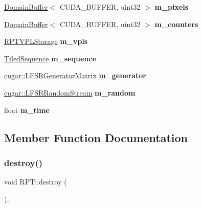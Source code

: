 \begin{DoxyCompactItemize}
\mbox{\label{struct_r_p_t_a7391b970846b087971be97cf5c9b7609}} 
\hyperlink{class_domain_buffer}{Domain\+Buffer}$<$ C\+U\+D\+A\+\_\+\+B\+U\+F\+F\+ER, uint32 $>$ {\bfseries m\+\_\+pixels}
\item 
\mbox{\label{struct_r_p_t_ae5e2d6769ba70cc660adf45915e0ebca}} 
\hyperlink{class_domain_buffer}{Domain\+Buffer}$<$ C\+U\+D\+A\+\_\+\+B\+U\+F\+F\+ER, uint32 $>$ {\bfseries m\+\_\+counters}
\item 
\mbox{\label{struct_r_p_t_a699e428743a17f8c336aab20711716ad}} 
\hyperlink{struct_r_p_t_v_p_l_storage}{R\+P\+T\+V\+P\+L\+Storage} {\bfseries m\+\_\+vpls}
\item 
\mbox{\label{struct_r_p_t_a6db90337620980f371318f7b10a6a8e1}} 
\hyperlink{struct_tiled_sequence}{Tiled\+Sequence} {\bfseries m\+\_\+sequence}
\item 
\mbox{\label{struct_r_p_t_a941c8604df3244c0d7da600307c1adec}} 
\hyperlink{classcugar_1_1_l_f_s_r_generator_matrix}{cugar\+::\+L\+F\+S\+R\+Generator\+Matrix} {\bfseries m\+\_\+generator}
\item 
\mbox{\label{struct_r_p_t_a1895a2f03428311f093a5f6d9451570a}} 
\hyperlink{structcugar_1_1_l_f_s_r_random_stream}{cugar\+::\+L\+F\+S\+R\+Random\+Stream} {\bfseries m\+\_\+random}
\item 
\mbox{\label{struct_r_p_t_a9e7ffda9319084b048dc97e41325b189}} 
float {\bfseries m\+\_\+time}
\end{DoxyCompactItemize}


\subsection{Member Function Documentation}
\mbox{\label{struct_r_p_t_a201a475612d2fa357ff9fa6d75ad5dfe}} 
\subsubsection{\texorpdfstring{destroy()}{destroy()}}
{\footnotesize\ttfamily void R\+P\+T\+::destroy (\begin{DoxyParamCaption}{ }\end{DoxyParamCaption})\hspace{0.3cm}{\ttfamily [inline]}, {\ttfamily [virtual]}}

